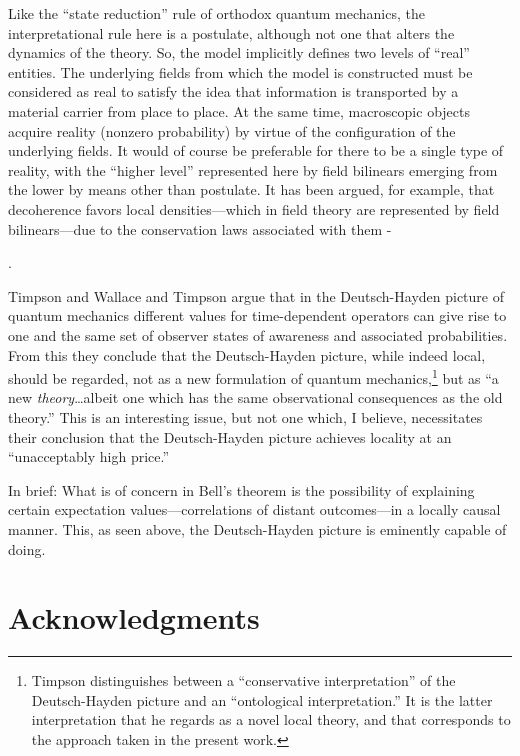 \documentclass[12pt]{article}
\begin{document}
Like the ``state reduction'' rule of orthodox quantum mechanics, the interpretational rule here is a postulate,
although not one that alters the dynamics of the theory. So, the model implicitly defines two levels of ``real''
entities. The underlying fields from which the model is constructed must be considered as real to satisfy the idea that information
is transported by a material carrier from place to place. At the same time, macroscopic objects acquire reality (nonzero probability) 
by virtue of the configuration of the underlying fields.  It would of course be preferable for there to be a single
type of reality, with the ``higher level'' represented here by field bilinears emerging from the lower by means
other than postulate. It has been argued, for example,  that decoherence favors local densities---which in field theory are represented
by field bilinears---due to the conservation laws associated with them \cite{GellMannHartle93}-{\cite{Halliwell09}. 
 

Timpson \cite{Timpson2005} and Wallace and Timpson \cite{WallaceTimpson07} argue that in the Deutsch-Hayden picture of quantum mechanics different values for time-dependent operators can give rise to one and the same set of   observer states of awareness and associated  probabilities.  From this they conclude that the Deutsch-Hayden picture, while indeed local, should be regarded, not  as a new formulation of quantum mechanics,\footnote{Timpson \cite{Timpson2005} distinguishes between a ``conservative interpretation'' of the Deutsch-Hayden picture and an ``ontological interpretation.'' It is the latter interpretation that  he regards as a novel local theory, and that corresponds to the approach taken in the present work.} but as ``a new {\em theory}\/\ldots albeit one which has the same observational consequences as the old theory.''\cite{WallaceTimpson07}  This is an interesting issue, but not one which,  I believe, necessitates their conclusion that the Deutsch-Hayden picture achieves locality  at an  ``unacceptably high price.''\cite{WallaceTimpson07}

In brief:  What is of concern in Bell's theorem is the possibility  
of explaining certain expectation values---correlations of distant outcomes---in a locally causal manner. This, as seen above, the Deutsch-Hayden picture is
eminently capable of doing.







\section*{Acknowledgments}

}
\end{document}
